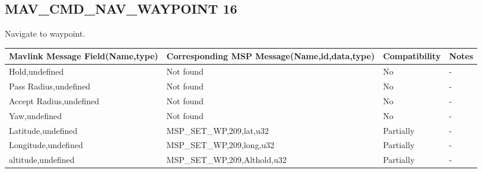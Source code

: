 \cleardoublepage


\subsection{MAV\_CMD\_NAV\_WAYPOINT 16} 
Navigate to waypoint.\\

{
\centering
\begin{tabular}{ |p{4cm  } |p{7cm} | p{2cm}|m{5em}|}
\hline
Mavlink Message Field(Name,type)&Corresponding MSP Message(Name,id,data,type)& Compatibility & Notes\\
\hline
Hold,undefined & Not found & No & - \\
\hline
Pass Radius,undefined & Not found & No & - \\
\hline
Accept Radius,undefined & Not found & No & - \\
\hline
Yaw,undefined & Not found & No & - \\
\hline
\rowcolor{lightgray}
Latitude,undefined & MSP\_SET\_WP,209,lat,u32& Partially & - \\
\hline
\rowcolor{lightgray}
Longitude,undefined & MSP\_SET\_WP,209,long,u32& Partially & - \\
\hline
\rowcolor{lightgray}
altitude,undefined & MSP\_SET\_WP,209,Althold,u32& Partially & - \\
\end{tabular}
}

\cleardoublepage

